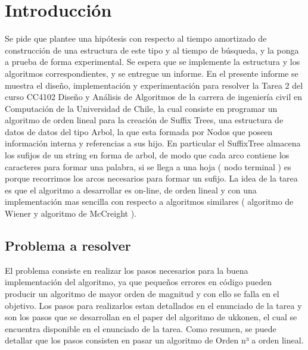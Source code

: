 \documentclass[letterpaper,10pt]{article}
\begin{document}
	\tableofcontents

	\newpage

	\section{Introducción}
	
	

	Se pide que plantee una hipótesis con respecto al tiempo amortizado de construcción de una estructura de este
	tipo y al tiempo de búsqueda, y la ponga a prueba de forma experimental.
	Se espera que se implemente la estructura y los algoritmos correspondientes, y se entregue un informe.
	En el presente informe se muestra el diseño, implementación y experimentación para resolver la Tarea 2 del curso CC4102 Diseño y Análisis de Algoritmos de la carrera de ingeniería civil en Computación de la Universidad de Chile, la cual consiste en programar un algoritmo de orden lineal para la creación de Suffix Trees, una estructura de datos de datos del tipo Arbol, la que esta formada por Nodos que poseen información interna y referencias a sus hijo. En particular el SuffixTree almacena los sufijos de un string en forma de arbol, de modo que cada arco contiene los caracteres para formar una palabra, si se llega a una hoja ( nodo terminal ) es porque recorrimos los arcos necesarios para formar un sufijo. La idea de la tarea es que el algoritmo a desarrollar es on-line, de orden lineal y con una implementación mas sencilla con respecto a algoritmos similares ( algoritmo de Wiener y algoritmo de McCreight ). 
	
	
	
	\subsection{Problema a resolver}
	El problema consiste en realizar los pasos necesarios para la buena implementación del algoritmo, ya que pequeños errores en código pueden producir un algoritmo de mayor orden de magnitud y con ello se falla en el objetivo. Los pasos para realizarlos estan detallados en el enunciado de la tarea y son los pasos que se desarrollan en el paper del algoritmo de ukkonen, el cual se encuentra disponible en el enunciado de la tarea. Como resumen, se puede detallar que los pasos consisten en pasar un algoritmo de Orden n³ a orden lineal.	
\end{document}
